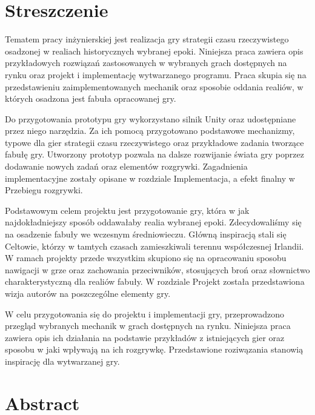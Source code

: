 \chapter*{Streszczenie}
Tematem pracy inżynierskiej jest realizacja gry strategii czasu rzeczywistego osadzonej w realiach historycznych
wybranej epoki. Niniejsza praca zawiera opis przykładowych rozwiązań zastosowanych w wybranych grach dostępnych na rynku
oraz projekt i implementację wytwarzanego programu. Praca skupia się na przedstawieniu zaimplementowanych mechanik oraz
sposobie oddania realiów, w których osadzona jest fabuła opracowanej gry.

Do przygotowania prototypu gry wykorzystano silnik Unity oraz udostępniane przez niego narzędzia. Za ich pomocą
przygotowano podstawowe mechanizmy, typowe dla gier strategii czasu rzeczywistego oraz przykładowe zadania tworzące
fabułę gry. Utworzony prototyp pozwala na dalsze rozwijanie świata gry poprzez dodawanie nowych zadań oraz elementów
rozgrywki. Zagadnienia implementacyjne zostały opisane w rozdziale Implementacja, a efekt finalny w Przebiegu rozgrywki.

Podstawowym celem projektu jest przygotowanie gry, która w jak najdokładniejszy sposób oddawałaby realia wybranej epoki.
Zdecydowaliśmy się na osadzenie fabuły we wczesnym średniowieczu. Główną inspiracją stali się Celtowie, którzy w
tamtych czasach zamieszkiwali terennu współczesnej Irlandii. W ramach projekty przede wszystkim skupiono się na
opracowaniu sposobu nawigacji w grze oraz zachowania przeciwników, stosujących broń oraz słownictwo charakterystyczną
dla realiów fabuły. W rozdziale Projekt została przedstawiona wizja autorów na poszczególne elementy gry.

W celu przygotowania się do projektu i implementacji gry, przeprowadzono przegląd wybranych mechanik w grach dostępnych
na rynku. Niniejsza praca zawiera opis ich działania na podstawie przykładów z istniejących gier oraz sposobu w jaki
wpływają na ich rozgrywkę. Przedstawione roziwązania stanowią inspirację dla wytwarzanej gry.


\chapter*{Abstract}
